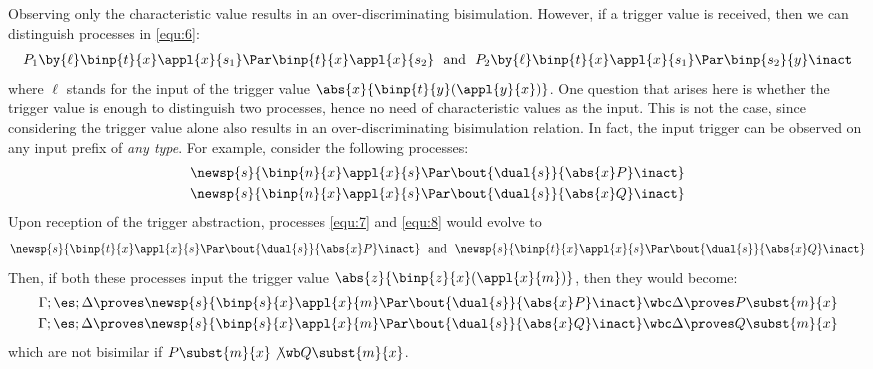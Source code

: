 \begin{example}
Observing only the characteristic value 
results in an over-discriminating bisimulation.
However, if a trigger value is received, 
then we can distinguish 
processes in \eqref{equ:6}:  
%
\begin{eqnarray*}
	P_1 \by{\ell} \binp{t}{x} \appl{x}{s_1} \Par \binp{t}{x} \appl{x}{s_2} 
	\mbox{~~and~~}
	P_2 \by{\ell} \binp{t}{x} \appl{x}{s_1} \Par \binp{s_2}{y} \inact 
\end{eqnarray*}
%
where $\ell$ stands for the input of the trigger value
$\abs{{x}}{\binp{t}{y} (\appl{y}{{x}})}$.
One question that arises here is whether the trigger value is enough
to distinguish two processes, hence no need of 
characteristic values as the input. 
This is not the case, since considering the trigger value
alone also results in an over-discriminating bisimulation relation.
In fact, the input trigger can be observed on any input prefix
of {\em any type}. For example, consider the following processes:
%
\begin{eqnarray}
	 \newsp{s}{\binp{n}{x} \appl{x}{s} \Par \bout{\dual{s}}{\abs{x} P} \inact} \label{equ:7}
	\\
	 \newsp{s}{\binp{n}{x} \appl{x}{s} \Par \bout{\dual{s}}{\abs{x} Q} \inact} \label{equ:8}
\end{eqnarray}
%
\noi 
Upon reception of the trigger abstraction, 
processes \eqref{equ:7} and \eqref{equ:8}
would evolve to 
\begin{eqnarray*}
	\newsp{s}{\binp{t}{x} \appl{x}{s} \Par \bout{\dual{s}}{\abs{x} P} \inact} 
	\mbox{~~and~~}
	\newsp{s}{\binp{t}{x} \appl{x}{s} \Par \bout{\dual{s}}{\abs{x} Q} \inact}
\end{eqnarray*}
%
Then, 
if both these processes input the trigger value $\abs{z}{\binp{z}{x} (\appl{x}{m})}$,  
then they would become:
\begin{eqnarray*}
\Gamma; \es; \Delta \proves \newsp{s}{\binp{s}{x} \appl{x}{m} \Par \bout{\dual{s}}{\abs{x} P} \inact} \wbc \Delta \proves P \subst{m}{x}
	\\
\Gamma; \es; \Delta \proves \newsp{s}{\binp{s}{x} \appl{x}{m} \Par \bout{\dual{s}}{\abs{x} Q} \inact} \wbc \Delta \proves Q \subst{m}{x}
\end{eqnarray*}
\noi which are not bisimilar if $P \subst{m}{x} \not\wb Q \subst{m}{x}$.
\end{example}

